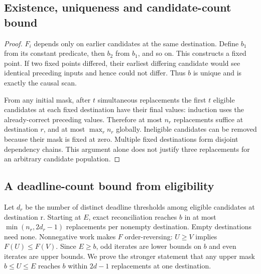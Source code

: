 \documentclass[12pt,a4paper]{article}
\begin{document}
\FloatBarrier
\subsection{Existence, uniqueness and candidate-count bound}\label{sec:C.2}

\begin{proof}

$F_i$ depends only on earlier candidates at the same destination. Define $b_1$ from its constant predicate, then $b_2$ from $b_1$, and so on. This constructs a fixed point. If two fixed points differed, their earliest differing candidate would see identical preceding inputs and hence could not differ. Thus $b$ is unique and is exactly the causal scan.

From any initial mask, after $t$ simultaneous replacements the first $t$ eligible candidates at each fixed destination have their final values: induction uses the already-correct preceding values. Therefore at most $n_r$ replacements suffice at destination $r$, and at most $\max_r n_r$ globally. Ineligible candidates can be removed because their mask is fixed at zero. Multiple fixed destinations form disjoint dependency chains. This argument alone does not justify three replacements for an arbitrary candidate population.

\end{proof}

\FloatBarrier
\subsection{A deadline-count bound from eligibility}\label{sec:C.3}

Let $d_r$ be the number of distinct deadline thresholds among eligible candidates at destination r. Starting at $E$, exact reconciliation reaches $b$ in at most $\min(n_r,2d_r-1)$ replacements per nonempty destination. Empty destinations need none. Nonnegative work makes $F$ order-reversing: $U\geq V$ implies $F(U)\leq F(V)$. Since $E\geq b$, odd iterates are lower bounds on $b$ and even iterates are upper bounds. We prove the stronger statement that any upper mask $b\leq U\leq E$ reaches $b$ within $2d-1$ replacements at one destination.
\end{document}

